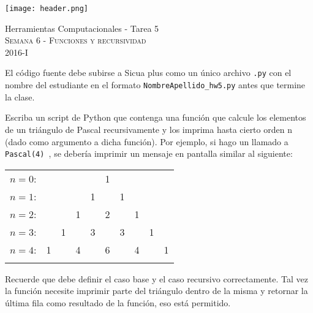 \documentclass[11pt,letterpaper]{exam}
\begin{document}
\begin{center}

\texttt{[image: header.png]}

\vspace{1.0cm}
{\Large Herramientas Computacionales - Tarea 5} \\
\textsc{Semana 6 - Funciones y recursividad}\\
2016-I\\
\end{center}



\vspace{0.5cm}

\noindent
El c\'odigo fuente debe subirse a Sicua plus como un \'unico archivo
\verb".py" con el nombre del estudiante en el formato \verb"NombreApellido_hw5.py" antes que termine la clase.

\vspace{0.5cm}

\begin{questions}
 

Escriba un script de Python que contenga una funci\'on que calcule los elementos de un tri\'angulo de Pascal recursivamente y los imprima hasta cierto orden n (dado como argumento a dicha funci\'on). Por ejemplo, si hago un llamado a \verb+ Pascal(4) +, se deber\'ia imprimir un mensaje en pantalla similar al siguiente:


\begin{center}

\begin{tabular}{rccccccccc}
$n=0$:&    &    &    &    &  1\\\noalign{\smallskip\smallskip}
$n=1$:&    &    &    &  1 &    &  1\\\noalign{\smallskip\smallskip}
$n=2$:&    &    &  1 &    &  2 &    &  1\\\noalign{\smallskip\smallskip}
$n=3$:&    &  1 &    &  3 &    &  3 &    &  1\\\noalign{\smallskip\smallskip}
$n=4$:&  1 &    &  4 &    &  6 &    &  4 &    &  1\\\noalign{\smallskip\smallskip}
\end{tabular}
\end{center}


Recuerde que debe definir el caso base y el caso recursivo correctamente. Tal vez la funci\'on necesite imprimir parte del tri\'angulo dentro de la misma y retornar la \'ultima fila como resultado de la funci\'on, eso est\'a permitido. 

\end{questions}
\end{document}
